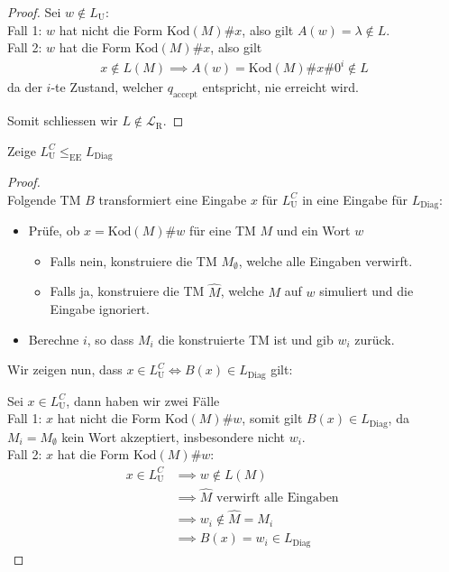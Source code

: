 \documentclass[a4paper,ngerman,12pt]{exam}
\newcommand\kod{\text{Kod}}
\newcommand\Lu{L_{\mathrm{U}}}
\newcommand\LR{\mathcal{L}_{\mathrm{R}}}
\newcommand\LDiag{L_{\mathrm{Diag}}}
\begin{document}
\begin{questions}
\begin{solutionorbox}[18em]
\begin{proof}
        Sei $w \not\in \Lu$: \\
        Fall 1: $w$ hat nicht die Form $\kod(M)\#x$, also gilt $A(w) = \lambda \not\in L$. \\
        Fall 2: $w$ hat die Form $\kod(M)\#x$, also gilt
        \begin{align*}
        x \not\in L(M) \implies A(w) = \kod(M)\#x\#0^i \not\in L
        \end{align*}
        da der $i$-te Zustand, welcher $q_{\mathrm{accept}}$
        entspricht, nie erreicht wird.

        Somit schliessen wir $L \not \in \LR$.
      \end{proof}
  \end{solutionorbox}

\ifprintanswers
\newpage
\fi

\question
   Zeige
      $\Lu^C \leq_{\mathrm{EE}} \LDiag$
    \begin{solutionorbox}[18em]
      \begin{proof} $ $ \\
      Folgende TM $B$ transformiert eine Eingabe $x$ für $\Lu^C$ in eine Eingabe für $\LDiag$:
      \begin{itemize}
      \item Prüfe, ob $x = \kod(M)\#w$ für eine TM $M$ und ein Wort $w$
      \begin{itemize}
        \item Falls nein, konstruiere die TM $M_{\emptyset}$, welche alle Eingaben verwirft.
        \item Falls ja, konstruiere die TM $\widehat{M}$, welche $M$ auf $w$ simuliert und
          die Eingabe ignoriert.
      \end{itemize}
      \item Berechne $i$, so dass $M_i$ die konstruierte TM ist und gib $w_i$ zurück.
      \end{itemize}
      Wir zeigen nun, dass $x \in \Lu^C \iff B(x) \in \LDiag$ gilt:

        Sei $x \in \Lu^C$, dann haben wir zwei Fälle \\
        Fall 1: $x$ hat nicht die Form $\kod(M)\#w$, somit gilt $B(x) \in \LDiag$,
        da $M_i = M_{\emptyset}$
        \hspace*{2.8em} kein Wort akzeptiert, insbesondere nicht $w_i$. \\
        Fall 2: $x$ hat die Form $\kod(M)\#w$:
        \begin{align*}
          x  \in \Lu^C &\implies w\not\in L(M) \\
          &\implies \widehat{M} \text{ verwirft alle Eingaben } \\
          &\implies w_i \not\in \widehat{M} = M_i \\
          &\implies B(x) = w_i \in \LDiag
        \end{align*}


\end{proof}
\end{solutionorbox}
\end{questions}
\end{document}
